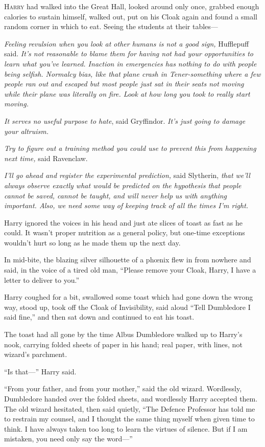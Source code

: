 
\lettrine{H}{arry} had walked into the Great Hall, looked around only once, grabbed enough calories to sustain himself, walked out, put on his Cloak again and found a small random corner in which to eat. Seeing the students at their tables—

\emph{Feeling revulsion when you look at other humans is not a good sign,} Hufflepuff said. \emph{It’s not reasonable to blame them for having not had your opportunities to learn what you’ve learned. Inaction in emergencies has nothing to do with people being selfish. Normalcy bias, like that plane crash in Tener-something where a few people ran out and escaped but most people just sat in their seats not moving while their plane was literally on fire. Look at how long \emph{you} took to really start moving.}

\emph{It serves no useful purpose to hate}, said Gryffindor. \emph{It’s just going to damage your altruism.}

\emph{Try to figure out a training method you could use to prevent this from happening next time,} said Ravenclaw.

\emph{I’ll go ahead and register the experimental prediction,} said Slytherin, \emph{that we’ll always observe exactly what would be predicted on the hypothesis that people cannot be saved, cannot be taught, and will never help us with anything important. Also, we need some way of keeping track of all the times I’m right.}

Harry ignored the voices in his head and just ate slices of toast as fast as he could. It wasn’t proper nutrition as a general policy, but one-time exceptions wouldn’t hurt so long as he made them up the next day.

In mid-bite, the blazing silver silhouette of a phœnix flew in from nowhere and said, in the voice of a tired old man,
“Please remove your Cloak, Harry, I have a letter to deliver to you.”

Harry coughed for a bit, swallowed some toast which had gone down the wrong way, stood up, took off the Cloak of Invisibility, said aloud
“Tell Dumbledore I said fine,” and then sat down and continued to eat his toast.

The toast had all gone by the time Albus Dumbledore walked up to Harry’s nook, carrying folded sheets of paper in his hand; real paper, with lines, not wizard’s parchment.

“Is that—” Harry said.

“From your father, and from your mother,” said the old wizard. Wordlessly, Dumbledore handed over the folded sheets, and wordlessly Harry accepted them. The old wizard hesitated, then said quietly,
“The Defence Professor has told me to restrain my counsel, and I thought the same thing myself when given time to think. I have always taken too long to learn the virtues of silence. But if I am mistaken, you need only say the word—”

